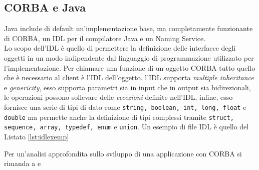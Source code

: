 \subsection{CORBA e Java}
Java include di default un'implementazione base, ma completamente funzionante di CORBA, un IDL per il compilatore Java e un Naming Service.\\
Lo scopo dell'IDL è quello di permettere la definizione delle interfacce degli oggetti in un modo indipendente dal linguaggio di programmazione utilizzato per l'implementazione. Per chiamare una funzione di un oggetto CORBA tutto quello che è necessario al client è l'IDL dell'oggetto. l'IDL supporta \emph{multiple inheritance} e \emph{genericity}, esso supporta parametri sia in input che in output sia bidirezionali, le operazioni possono sollevare delle \emph{eccezioni} definite nell'IDL, infine, esso fornisce una serie di tipi di dato come \texttt{string, boolean, int, long, float} e \texttt{double} ma permette anche la definizione di tipi complessi tramite \texttt{struct, sequence, array, typedef, enum} e \texttt{union}.
Un esempio di file IDL è quello del Listato \ref{lst:idlexemp}

Per un'analisi approfondita sullo sviluppo di una applicazione con CORBA si rimanda a \cite{cugola:corba} e \cite{sun:corba}